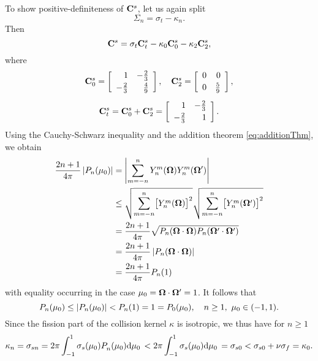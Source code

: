 To show positive-definiteness of $\mat{C}^s$, let us
again split 
$$
	\Sigma_n = \sigma_t - \kappa_n.
$$
Then 
\begin{equation}\label{eq:Cs}
	\mat{C}^s = \sigma_t\mat{C}^s_t - \kappa_0 \mat{C}^s_0 - \kappa_2 \mat{C}^s_2,
\end{equation}
where
\begin{equation}\label{eq:Cs2}
\begin{gathered}
	\mat{C}^s_0 = \left[
\begin{array}{rr}
 1 & -\frac{2}{3} \\[.2em]
 -\frac{2}{3} & \frac{4}{9} \\
\end{array}
\right],\quad
\mat{C}^s_2 = 
\left[
\begin{array}{rr}
 0 & 0 \\[.2em]
 0 & \frac{5}{9} \\
\end{array}
\right],\\[.5em]
\mat{C}^s_t = \mat{C}^s_0 + \mat{C}^s_2 = \left[
\begin{array}{rr}
 1 & -\frac{2}{3} \\[.2em]
 -\frac{2}{3} & 1 \\
\end{array}
\right].
\end{gathered}
\end{equation}
Using the Cauchy-Schwarz inequality and the addition theorem \eqref{eq:additionThm}, we obtain
\begin{equation*}
\begin{aligned}
	\frac{2n+1}{4\pi}\abs{P_n(\mu_0)}&=\abs{\suma[m]{-n}{n}\Y{n}{m}(\bomega)\Y{n}{m}(\bomega')}\\
	&\leq	
	\sqrt{\suma[m]{-n}{n}\bigl[\Y{n}{m}(\bomega)\bigr]^2}\sqrt{\suma[m]{-n}{n}\bigl[\Y{n}{m}(\bomega')\bigr]^2}\\
	&=  \frac{2n+1}{4\pi} \sqrt{P_n(\bomega\cdot\bomega)P_n(\bomega'\cdot\bomega')}\\
	&= 	\frac{2n+1}{4\pi} \abs{P_n(\bomega\cdot\bomega)}\\
	&= 	\frac{2n+1}{4\pi} P_n(1)
\end{aligned}
\end{equation*}
with equality occurring in the case $\mu_0 = \bomega\cdot\bomega' = 1$.
It follows that 
$$
	P_n(\mu_0) \leq \abs{P_n(\mu_0)} < P_n(1) = 1 = P_0(\mu_0),\quad n \geq 1,\ \mu_0\in(-1,1).
$$
Since the fission part of the collision kernel
$\kappa$ is isotropic, we thus have for $n \geq 1$
\begin{equation}\label{eq:kappa_inequality}
	\kappa_n = \sigma_{sn} = 2\pi \muint[_0]{\sigma_s(\mu_0)\P{n}{}(\mu_0)} < 2\pi
	\muint[_0]{\sigma_s(\mu_0)} = \sigma_{s0} < \sigma_{s0} + \nu\sigma_f = \kappa_0. 
\end{equation}
